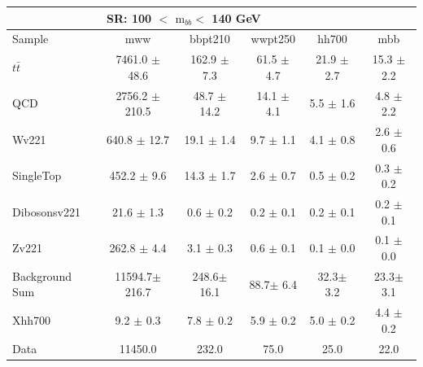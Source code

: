 \documentclass{beamer}
\newcommand*{\ttbar}{\ensuremath{t\bar{t}}\xspace}
\newcommand*{\mbb}{\ensuremath{\text{m}_{bb}}\xspace}
\newcommand*{\header}[1]{\fontsize{16}{8}\selectfont \textbf{{\color{MyPurple}{#1}}}}
\begin{document}
\begin{frame}
\begin{center}
\header{low-mass SR}
\end{center}
\begin{table}
\tiny
\begin{tabular}{l|c|c|c|c|c}
\hline\hline
\multicolumn{5}{c}{\textbf{SR}: 100 $<$ \mbb $<$ 140 GeV}\\\hline\hline
Sample  	& mww 	& bbpt210 	& wwpt250 	& hh700 	& mbb  \\\hline
\ttbar 	& 7461.0 $\pm$ 48.6 	& 162.9 $\pm$ 7.3 	& 61.5 $\pm$ 4.7 	& 21.9 $\pm$ 2.7 	& 15.3 $\pm$ 2.2	\\\hline 
QCD 	& 2756.2 $\pm$ 210.5 	& 48.7 $\pm$ 14.2 	& 14.1 $\pm$ 4.1 	& 5.5 $\pm$ 1.6 	& 4.8 $\pm$ 2.2	\\\hline 
Wv221 	& 640.8 $\pm$ 12.7 	& 19.1 $\pm$ 1.4 	& 9.7 $\pm$ 1.1 	& 4.1 $\pm$ 0.8 	& 2.6 $\pm$ 0.6	\\\hline 
SingleTop 	& 452.2 $\pm$ 9.6 	& 14.3 $\pm$ 1.7 	& 2.6 $\pm$ 0.7 	& 0.5 $\pm$ 0.2 	& 0.3 $\pm$ 0.2	\\\hline 
Dibosonsv221 	& 21.6 $\pm$ 1.3 	& 0.6 $\pm$ 0.2 	& 0.2 $\pm$ 0.1 	& 0.2 $\pm$ 0.1 	& 0.2 $\pm$ 0.1	\\\hline 
Zv221 	& 262.8 $\pm$ 4.4 	& 3.1 $\pm$ 0.3 	& 0.6 $\pm$ 0.1 	& 0.1 $\pm$ 0.0 	& 0.1 $\pm$ 0.0	\\\hline 
\hline
Background Sum 	& 11594.7$\pm$ 216.7 	& 248.6$\pm$ 16.1 	& 88.7$\pm$ 6.4 	& 32.3$\pm$ 3.2 	& 23.3$\pm$ 3.1	\\\hline 
\hline
Xhh700 	& 9.2 $\pm$ 0.3 	& 7.8 $\pm$ 0.2 	& 5.9 $\pm$ 0.2 	& 5.0 $\pm$ 0.2 	& 4.4 $\pm$ 0.2	\\\hline 
Data 	& 11450.0 	& 232.0 	& 75.0 	& 25.0 	& 22.0	\\\hline 
\end{tabular}
\end{table}
\end{frame}
\end{document}
